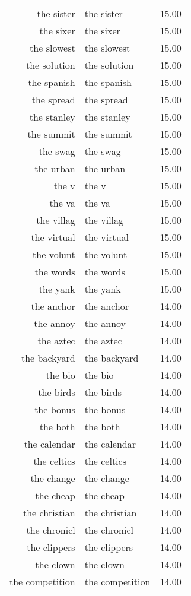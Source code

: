 \begin{table}[ht]
\begin{tabular}{rlr}
  the sister & the sister & 15.00 \\ 
  the sixer & the sixer & 15.00 \\ 
  the slowest & the slowest & 15.00 \\ 
  the solution & the solution & 15.00 \\ 
  the spanish & the spanish & 15.00 \\ 
  the spread & the spread & 15.00 \\ 
  the stanley & the stanley & 15.00 \\ 
  the summit & the summit & 15.00 \\ 
  the swag & the swag & 15.00 \\ 
  the urban & the urban & 15.00 \\ 
  the v & the v & 15.00 \\ 
  the va & the va & 15.00 \\ 
  the villag & the villag & 15.00 \\ 
  the virtual & the virtual & 15.00 \\ 
  the volunt & the volunt & 15.00 \\ 
  the words & the words & 15.00 \\ 
  the yank & the yank & 15.00 \\ 
  the anchor & the anchor & 14.00 \\ 
  the annoy & the annoy & 14.00 \\ 
  the aztec & the aztec & 14.00 \\ 
  the backyard & the backyard & 14.00 \\ 
  the bio & the bio & 14.00 \\ 
  the birds & the birds & 14.00 \\ 
  the bonus & the bonus & 14.00 \\ 
  the both & the both & 14.00 \\ 
  the calendar & the calendar & 14.00 \\ 
  the celtics & the celtics & 14.00 \\ 
  the change & the change & 14.00 \\ 
  the cheap & the cheap & 14.00 \\ 
  the christian & the christian & 14.00 \\ 
  the chronicl & the chronicl & 14.00 \\ 
  the clippers & the clippers & 14.00 \\ 
  the clown & the clown & 14.00 \\ 
  the competition & the competition & 14.00 \\ 

\end{tabular}
\end{table}

